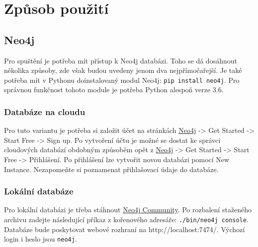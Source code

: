 \documentclass[10pt,xcolor=pdflatex,dvipsnames,table,oneside]{book}
\begin{document}
\chapter{Způsob použití}

\section{Neo4j}

Pro spuštění je potřeba mít přístup k Neo4j databázi. Toho se dá dosáhnout několika způsoby, zde však budou uvedeny
jenom dva nejpřímočařejší. Je také potřeba mít v Pythonu doinstalovaný modul Neo4j: \verb|pip install neo4j|.
Pro správnou funkčnost tohoto module je potřeba Python alespoň verze 3.6.

\subsection{Databáze na cloudu}
Pro tuto variantu je potřeba si založit účet na stránkách \href{https://neo4j.com/}{Neo4j} -> Get Started -> Start Free -> Sign up.
Po vytvoření účtu je možné se dostat ke správci cloudových databází obdobným způsoběm opět z \href{https://neo4j.com/}{Neo4j} ->
Get Started -> Start Free -> Přihlášení. Po přihlášení lze vytvořit novou databázi pomocí New Instance. Nezapomeňte si
poznamenat přihlašovací údaje do databáze.

\subsection{Lokální databáze}
Pro lokální databázi je třeba stáhnout \href{https://neo4j.com/download-center/#community}{Neo4j Community}.
Po rozbalení staženého archivu zadejte následující příkaz z kořenového adresáře: \verb|./bin/neo4j console|.
Databáze bude poskytovat webové rozhraní na http://localhost:7474/. Výchozí login i heslo jsou \verb|neo4j|.
\end{document}
